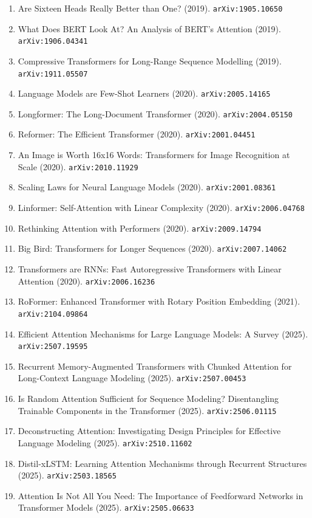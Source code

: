 \documentclass[11pt]{article}
\begin{document}
\begin{enumerate}
  \item Are Sixteen Heads Really Better than One? (2019). \texttt{arXiv:1905.10650}
  \item What Does BERT Look At? An Analysis of BERT's Attention (2019). \texttt{arXiv:1906.04341}
  \item Compressive Transformers for Long-Range Sequence Modelling (2019). \texttt{arXiv:1911.05507}
  \item Language Models are Few-Shot Learners (2020). \texttt{arXiv:2005.14165}
  \item Longformer: The Long-Document Transformer (2020). \texttt{arXiv:2004.05150}
  \item Reformer: The Efficient Transformer (2020). \texttt{arXiv:2001.04451}
  \item An Image is Worth 16x16 Words: Transformers for Image Recognition at
  Scale (2020). \texttt{arXiv:2010.11929}
  \item Scaling Laws for Neural Language Models (2020). \texttt{arXiv:2001.08361}
  \item Linformer: Self-Attention with Linear Complexity (2020). \texttt{arXiv:2006.04768}
  \item Rethinking Attention with Performers (2020). \texttt{arXiv:2009.14794}
  \item Big Bird: Transformers for Longer Sequences (2020). \texttt{arXiv:2007.14062}
  \item Transformers are RNNs: Fast Autoregressive Transformers with Linear
  Attention (2020). \texttt{arXiv:2006.16236}
  \item RoFormer: Enhanced Transformer with Rotary Position Embedding (2021). \texttt{arXiv:2104.09864}
  \item Efficient Attention Mechanisms for Large Language Models: A Survey (2025). \texttt{arXiv:2507.19595}
  \item Recurrent Memory-Augmented Transformers with Chunked Attention for Long-Context Language Modeling (2025). \texttt{arXiv:2507.00453}
  \item Is Random Attention Sufficient for Sequence Modeling? Disentangling Trainable Components in the Transformer (2025). \texttt{arXiv:2506.01115}
  \item Deconstructing Attention: Investigating Design Principles for Effective Language Modeling (2025). \texttt{arXiv:2510.11602}
  \item Distil-xLSTM: Learning Attention Mechanisms through Recurrent Structures (2025). \texttt{arXiv:2503.18565}
  \item Attention Is Not All You Need: The Importance of Feedforward Networks in Transformer Models (2025). \texttt{arXiv:2505.06633}

\end{enumerate}
\end{document}
